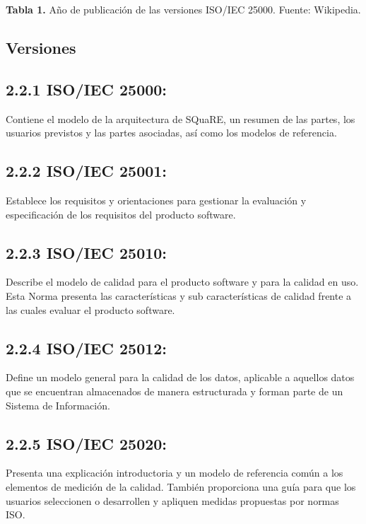 \documentclass[https://www.overleaf.com/project/63761df255a8a9f4a15c3579
	letterpaper, %
	10pt, %
]{CSUniSchoolLabReport}
\begin{document}
        \begin{center}
            \textbf{Tabla 1.}\hspace{0.5em} Año de publicación de las versiones ISO/IEC 25000. Fuente: Wikipedia.
        \end{center}

    \subsection{Versiones}

        \subsection*{2.2.1 \hspace{0.5em} ISO/IEC 25000:}
            Contiene el modelo de la arquitectura de SQuaRE, un resumen de las partes, los usuarios previstos y las partes asociadas, así como los modelos de referencia.

        \subsection*{2.2.2 \hspace{0.5em} ISO/IEC 25001:}
            Establece los requisitos y orientaciones para gestionar la evaluación y especificación de los requisitos del producto software.
            
        \subsection*{2.2.3 \hspace{0.5em} ISO/IEC 25010:}
        Describe el modelo de calidad para el producto software y para la calidad en uso. Esta Norma presenta las características y sub características de calidad frente a las cuales evaluar el producto software.
            
        \subsection*{2.2.4 \hspace{0.5em} ISO/IEC 25012:}
            Define un modelo general para la calidad de los datos, aplicable a aquellos datos que se encuentran almacenados de manera estructurada y forman parte de un Sistema de Información.
            
        \subsection*{2.2.5 \hspace{0.5em} ISO/IEC 25020:}
            Presenta una explicación introductoria y un modelo de referencia común a los elementos de medición de la calidad. También proporciona una guía para que los usuarios seleccionen o desarrollen y apliquen medidas propuestas por normas ISO.
            
\end{document}
